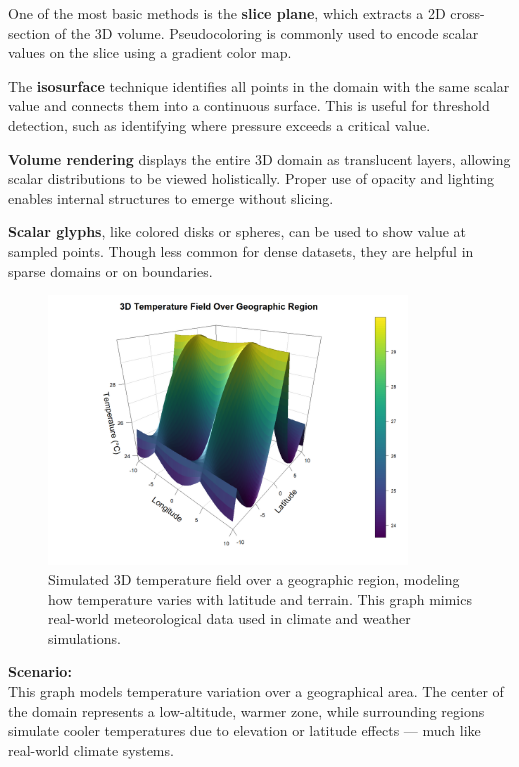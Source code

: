 \documentclass[11pt]{article}
\begin{document}
	One of the most basic methods is the \textbf{slice plane}, which extracts a 2D cross-section of the 3D volume. Pseudocoloring is commonly used to encode scalar values on the slice using a gradient color map.
	
	The \textbf{isosurface} technique identifies all points in the domain with the same scalar value and connects them into a continuous surface. This is useful for threshold detection, such as identifying where pressure exceeds a critical value.
	
	\textbf{Volume rendering} displays the entire 3D domain as translucent layers, allowing scalar distributions to be viewed holistically. Proper use of opacity and lighting enables internal structures to emerge without slicing.
	
	\textbf{Scalar glyphs}, like colored disks or spheres, can be used to show value at sampled points. Though less common for dense datasets, they are helpful in sparse domains or on boundaries.
	
		\vspace{4em}
	
	\begin{figure}[H]
		\centering
		\includegraphics[width=0.85\textwidth]{temperature_surface_meteorology.png}
		\caption{Simulated 3D temperature field over a geographic region, modeling how temperature varies with latitude and terrain. This graph mimics real-world meteorological data used in climate and weather simulations.}
		\label{fig:temperature_surface}
	\end{figure}
	
	\vspace{1em}
	
	\noindent
	\textbf{Scenario:} \\
	This graph models temperature variation over a geographical area. The center of the domain represents a low-altitude, warmer zone, while surrounding regions simulate cooler temperatures due to elevation or latitude effects — much like real-world climate systems.
	
\end{document}
